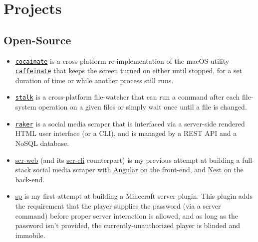 \documentclass[a4paper, 10pt]{article}
\begin{document}
	\section{Projects}
	\subsection{Open-Source}
	\begin{itemize}
		\item \href{https://github.com/AppleGamer22/cocainate}{\texttt{cocainate}} is a cross-platform re-implementation of the macOS utility \href{https://github.com/apple-oss-distributions/PowerManagement/tree/main/caffeinate}{\texttt{caffeinate}} that keeps the screen turned on either until stopped, for a set duration of time or while another process still runs.
		\item \href{https://github.com/AppleGamer22/stalk}{\texttt{stalk}} is a cross-platform file-watcher that can run a command after each file-system operation on a given files or simply wait once until a file is changed.
		\item \href{https://github.com/AppleGamer22/raker}{\texttt{raker}} is a social media scraper that is interfaced via a server-side rendered HTML user interface (or a CLI), and is managed by a REST API and a NoSQL database.
		\item \href{https://github.com/AppleGamer22/scr-web}{scr-web} (and its \href{https://github.com/AppleGamer22/scr-cli}{scr-cli} counterpart) is my previous attempt at building a full-stack social media scraper with \href{https://angular.io}{Angular} on the front-end, and \href{https://nestjs.com}{Nest} on the back-end.
		\item \href{https://github.com/AppleGamer22/sp}{sp} is my first attempt at building a Minecraft server plugin. This plugin adds the requirement that the player supplies the password (via a server command) before proper server interaction is allowed, and as long as the password isn't provided, the currently-unauthorized player is blinded and immobile.
	\end{itemize}
\end{document}
